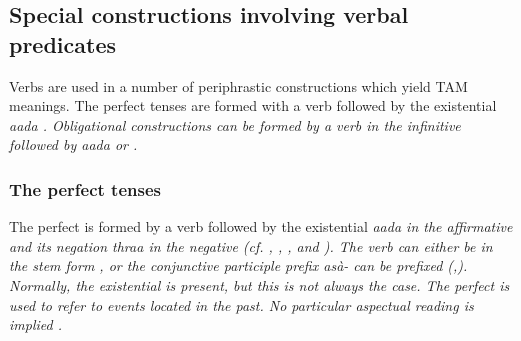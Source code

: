 % 



% 
% 
% 




\subsection{Special constructions involving verbal predicates}\label{sec:wc:Specialconstructionsinvolvingverbalpredicates}
Verbs are used in a number of periphrastic constructions which yield TAM meanings. The perfect tenses are formed with a verb followed by the existential \em aada \em {}. Obligational constructions can be formed by a verb in the infinitive followed by \em aada \em {} or  .

\subsubsection{The perfect tenses}\label{sec:wc:Theperfecttenses}
The perfect is formed by a verb followed by the existential \em aada \em in the affirmative and its negation \em thraa \em in the negative (cf. \citet[143]{Slomanson2006cll},
\citet{Slomanson2008lingua},
\citet[169f]{SmithEtAl2006cll},
and \citet{Ansaldo2009book}).
The verb can either be in the stem form , or the conjunctive participle prefix \em asà- \em can be prefixed  (\citet[143]{Slomanson2006cll},\citet{Slomanson2008lingua}). Normally, the existential is present, but this is not always the case. The perfect is used to refer to events located in the past. No particular aspectual reading is implied .

